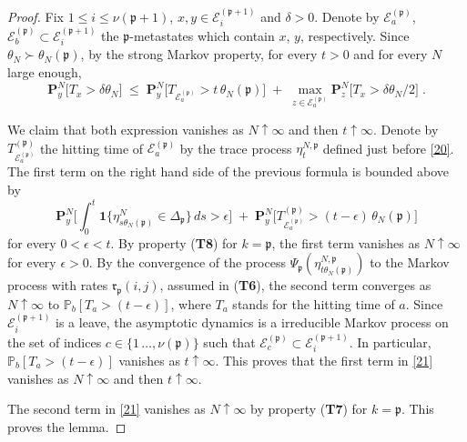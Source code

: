 \documentclass[reqno]{amsart}
\begin{document}
\begin{proof}
Fix $1\le i\le \nu({{\mathfrak p}} +1)$, $x, y\in {{\mathcal E}}^{({{\mathfrak p}}+1)}_i$ and
$\delta>0$. Denote by ${{\mathcal E}}^{({{\mathfrak p}})}_a$, ${{\mathcal E}}^{({{\mathfrak p}})}_b \subset
{{\mathcal E}}^{({{\mathfrak p}}+1)}_i$ the ${{\mathfrak p}}$-metastates which contain $x$, $y$,
respectively. Since $\theta_N \succ \theta_N ({{\mathfrak p}})$, by the strong
Markov property, for every $t>0$ and for every $N$ large enough,
\begin{equation}
\label{21}
{{\mathbf P}}^N_y \big[ T_{x} > \delta \theta_N \big]
\;\le\; {{\mathbf P}}^N_y \big[ T_{{{\mathcal E}}^{({{\mathfrak p}})}_a} > t \, \theta_N ({{\mathfrak p}}) \big]
\;+\; \max_{z \in {{\mathcal E}}^{({{\mathfrak p}})}_a} 
{{\mathbf P}}^N_z \big[ T_{x} > \delta \theta_N/2 \big]\; .
\end{equation} 

We claim that both expression vanishes as $N\uparrow\infty$ and then
$t\uparrow\infty$.  Denote by $T^{({{\mathfrak p}})}_{{{\mathcal E}}^{({{\mathfrak p}})}_a}$ the
hitting time of ${{\mathcal E}}^{({{\mathfrak p}})}_a$ by the trace process $\eta^{N,{{\mathfrak p}}}_t$ defined just before \eqref{20}. The first term on the right
hand side of the previous formula is bounded above by
\begin{equation*}
{{\mathbf P}}^N_y \Big[ \int_0^t {{\mathbf 1}}\{ \eta^N_{s \theta_N ({{\mathfrak p}})} 
\in \Delta_{{{\mathfrak p}}} \} \, ds > \epsilon \Big] 
\;+\; {{\mathbf P}}^N_y \Big[ T^{({{\mathfrak p}})}_{{{\mathcal E}}^{({{\mathfrak p}})}_a} > (t-\epsilon)
\, \theta_N ({{\mathfrak p}}) \Big]
\end{equation*}
for every $0<\epsilon<t$.  By property ({\bf T8}) for $k={{\mathfrak p}}$, the
first term vanishes as $N\uparrow\infty$ for every $\epsilon>0$. By
the convergence of the process $\Psi_{{{\mathfrak p}}} (\eta^{N,{{\mathfrak p}}}_{t
  \theta_N ({{\mathfrak p}})})$ to the Markov process with rates ${{\mathfrak r}}_{{{\mathfrak p}}}(i,j)$, assumed in ({\bf T6}), the second term converges as
$N\uparrow\infty$ to ${{\mathbb P}}_b [ T_a > (t-\epsilon) ]$, where $T_a$
stands for the hitting time of $a$. Since ${{\mathcal E}}^{({{\mathfrak p}} +1)}_i$ is a
leave, the asymptotic dynamics is a irreducible Markov process on the
set of indices $c \in \{1\, \dots, \nu({{\mathfrak p}})\}$ such that ${{\mathcal E}}^{({{\mathfrak p}})}_c \subset {{\mathcal E}}^{({{\mathfrak p}} +1)}_i$. In particular, ${{\mathbb P}}_b [
T_a > (t-\epsilon) ]$ vanishes as $t\uparrow\infty$. This proves that
the first term in \eqref{21} vanishes as $N\uparrow\infty$ and then
$t\uparrow\infty$.

The second term in \eqref{21} vanishes as $N\uparrow\infty$ by
property ({\bf T7}) for $k={{\mathfrak p}}$. This proves the lemma.
\end{proof}
\end{document}
